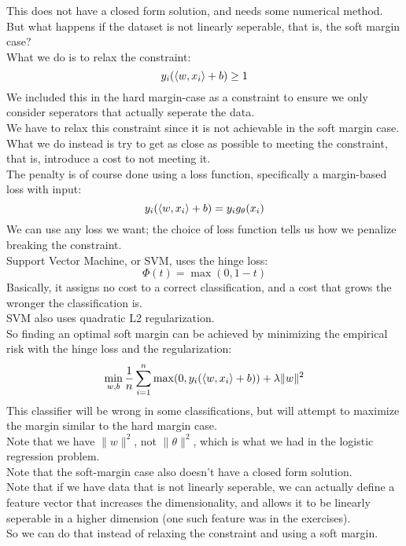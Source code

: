 \documentclass[12pt]{article}
\begin{document}
This does not have a closed form solution,
and needs some numerical method. \\

But what happens if the dataset is not linearly
seperable, that is, the soft margin case? \\
What we do is to relax the constraint:
\[ y_i(\left\langle w, x_i \right\rangle + b) \geq 1 \]
We included this in the hard margin-case as a constraint
to ensure we only consider seperators that actually
seperate the data. \\
We have to relax this constraint since it
is not achievable in the soft margin case.
What we do instead is try to get as close as possible
to meeting the constraint, that is, introduce a cost
to not meeting it. \\

The penalty is of course done using a loss function,
specifically a margin-based loss with input:
\[ y_i(\left\langle w, x_i \right\rangle + b) = y_ig_\theta(x_i) \]
We can use any loss we want; the choice of 
loss function tells us how we penalize
breaking the constraint. \\

Support Vector Machine, or SVM, uses 
the hinge loss:
\[ \Phi(t) = \max(0, 1-t) \]
Basically, it assigns no cost to a correct
classification, and a cost that grows the wronger
the classification is. \\

SVM also uses quadratic L2 regularization. \\
So finding an optimal soft margin can be achieved
by minimizing the empirical risk with the hinge loss
and the regularization:
\[ \min_{w, b} \dfrac{1}{n}
\sum_{i=1}^n \max(0, y_i(\left\langle w, x_i \right\rangle + b))
+ \lambda\|w\|^2 \]
This classifier will be wrong in some classifications,
but will attempt to maximize the margin similar
to the hard margin case. \\
Note that we have $\|w\|^2$,
not $\|\theta\|^2$,
which is what we had in the logistic regression problem. \\

Note that the soft-margin case also doesn't
have a closed form solution. \\

Note that if we have data that is not linearly seperable,
we can actually define a feature vector that increases
the dimensionality, and allows it to be linearly seperable
in a higher dimension (one such feature was in the
exercises). \\
So we can do that instead of relaxing the constraint
and using a soft margin. \\
\end{document}
